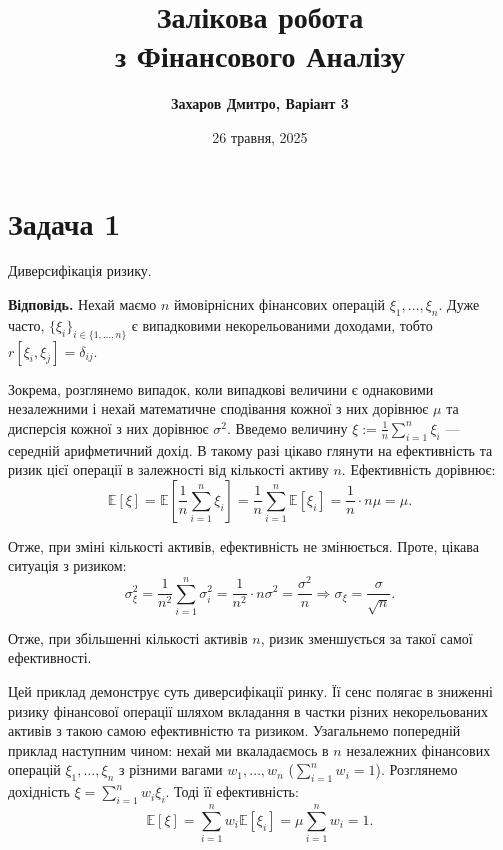 \documentclass{test_template}
\title{\bfseries Залікова робота \\з Фінансового Аналізу}
\author{\bfseries Захаров Дмитро, Варіант 3}
\date{26 травня, 2025}
\begin{document}
\pagestyle{fancy}

\maketitle

\tableofcontents

\newpage

\section{Задача 1}

\begin{problem}
    Диверсифікація ризику.
\end{problem}

\textbf{Відповідь.} Нехай маємо $n$ ймовірнісних фінансових операцій
$\xi_1,\dots,\xi_n$. Дуже часто, $\{\xi_i\}_{i \in \{1,\dots,n\}}$ є випадковими
некорельованими доходами, тобто $r[\xi_i,\xi_j] = \delta_{ij}$. 

Зокрема, розглянемо випадок, коли випадкові величини є однаковими незалежними і
нехай математичне сподівання кожної з них дорівнює $\mu$ та дисперсія кожної з
них дорівнює $\sigma^2$. Введемо величину $\xi := \frac{1}{n}\sum_{i=1}^n\xi_i$
--- середній арифметичний дохід. В такому разі цікаво глянути на ефективність та
ризик цієї операції в залежності від кількості активу $n$. Ефективність
дорівнює:
\begin{equation*}
    \mathbb{E}[\xi] = \mathbb{E}\left[\frac{1}{n}\sum_{i=1}^n\xi_i\right] = \frac{1}{n}\sum_{i=1}^n\mathbb{E}[\xi_i] = \frac{1}{n}\cdot n\mu = \mu.
\end{equation*}

Отже, при зміні кількості активів, ефективність не змінюється. Проте, цікава 
ситуація з ризиком:
\begin{equation*}
    \sigma_{\xi}^2 = \frac{1}{n^2}\sum_{i=1}^n \sigma_i^2 = \frac{1}{n^2} \cdot n\sigma^2 = \frac{\sigma^2}{n} \Rightarrow \sigma_{\xi} = \frac{\sigma}{\sqrt{n}}.
\end{equation*}

Отже, при збільшенні кількості активів $n$, ризик зменшується за такої самої
ефективності.

Цей приклад демонструє суть диверсифікації ринку. Її сенс полягає в зниженні
ризику фінансової операції шляхом вкладання в частки різних некорельованих
активів з такою самою ефективністю та ризиком. Узагальнемо попередній приклад
наступним чином: нехай ми вкаладаємось в $n$ незалежних фінансових операцій
$\xi_1,\dots,\xi_n$ з різними вагами $w_1,\dots,w_n$ ($\sum_{i=1}^n w_i = 1$).
Розглянемо дохідність $\xi = \sum_{i=1}^n w_i\xi_i$. Тоді її ефективність:
\begin{equation*}
    \mathbb{E}[\xi] = \sum_{i=1}^n w_i\mathbb{E}[\xi_i] = \mu\sum_{i=1}^n w_i = 1.
\end{equation*}
\end{document}
